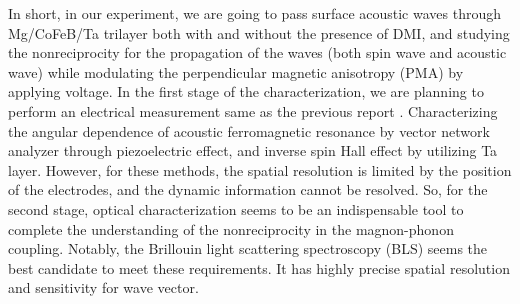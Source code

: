 In short, in our experiment, we are going to pass surface acoustic waves through Mg/CoFeB/Ta trilayer both with and without the presence of DMI, and studying the nonreciprocity for the propagation of the waves (both spin wave and acoustic wave) while modulating the perpendicular magnetic anisotropy (PMA) by applying voltage. In the first stage of the characterization, we are planning to perform an electrical measurement same as the previous report \cite{XuIEEMS2018}. Characterizing the angular dependence of acoustic ferromagnetic resonance by vector network analyzer through piezoelectric effect, and inverse spin Hall effect by utilizing Ta layer. However, for these methods, the spatial resolution is limited by the position of the electrodes, and the dynamic information cannot be resolved. So, for the second stage, optical characterization seems to be an indispensable tool to complete the understanding of the nonreciprocity in the magnon-phonon coupling. Notably, the Brillouin light scattering spectroscopy (BLS) seems the best candidate to meet these requirements. It has highly precise spatial resolution and sensitivity for wave vector.  

